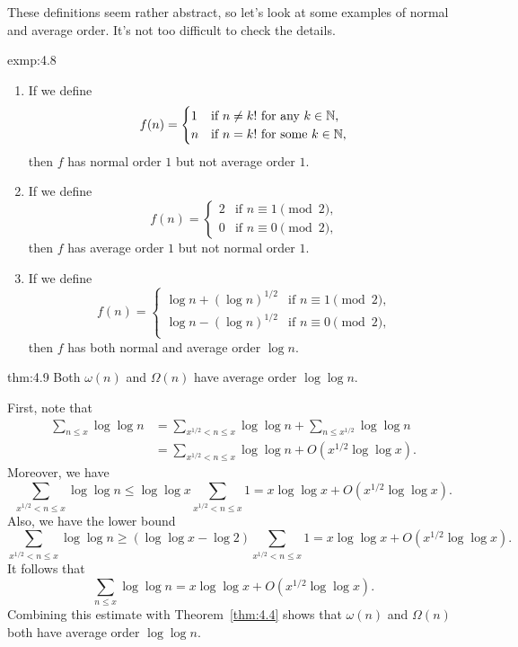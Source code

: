 These definitions seem rather abstract, so let's look at some examples of normal 
and average order. It's not too difficult to check the details. 

\begin{exmp}{exmp:4.8}
    \begin{enumerate}[(1)]
        \item If we define 
        \[ f(n) = \begin{cases} 1 & \text{if $n \neq k!$ for any $k \in \mathbb{N}$,} \\ 
            n & \text{if $n = k!$ for some $k \in \mathbb{N}$,} \end{cases} \] 
        then $f$ has normal order $1$ but not average order $1$. 
        \item If we define 
        \[ f(n) = \begin{cases} 2 & \text{if $n \equiv 1 \pmod 2$,} \\ 
            0 & \text{if $n \equiv 0 \pmod 2$,} \end{cases} \] 
        then $f$ has average order $1$ but not normal order $1$. 
        \item If we define 
        \[ f(n) = \begin{cases}
            \log n + (\log n)^{1/2} & \text{if $n \equiv 1 \pmod 2$,} \\ 
            \log n - (\log n)^{1/2} & \text{if $n \equiv 0 \pmod 2$,} \\ 
        \end{cases} \] 
        then $f$ has both normal and average order $\log n$.
    \end{enumerate}
\end{exmp}

\begin{theo}{thm:4.9}
    Both $\omega(n)$ and $\Omega(n)$ have average order $\log\log n$. 
\end{theo}
\begin{pf}
    First, note that 
    \begin{align*} 
        \sum_{n\leq x} \log\log n 
        &= \sum_{x^{1/2}<n\leq x} \log\log n + \sum_{n\leq x^{1/2}} \log\log n \\
        &= \sum_{x^{1/2}<n\leq x} \log\log n + O(x^{1/2}\log \log x). 
    \end{align*}
    Moreover, we have 
    \[ \sum_{x^{1/2} < n \leq x} \log\log n \leq \log\log x  
    \sum_{x^{1/2} < n \leq x} 1 = x\log\log x + O(x^{1/2}\log\log x). \] 
    Also, we have the lower bound 
    \[ \sum_{x^{1/2} < n \leq x} \log\log n \geq (\log\log x - \log 2) 
    \sum_{x^{1/2} < n \leq x} 1 = x\log\log x + O(x^{1/2}\log\log x). \] 
    It follows that 
    \[ \sum_{n\leq x} \log\log n = x\log\log x + O(x^{1/2}\log\log x). \] 
    Combining this estimate with Theorem~\ref{thm:4.4} shows that 
    $\omega(n)$ and $\Omega(n)$ both have average order $\log\log n$. 
\end{pf}


